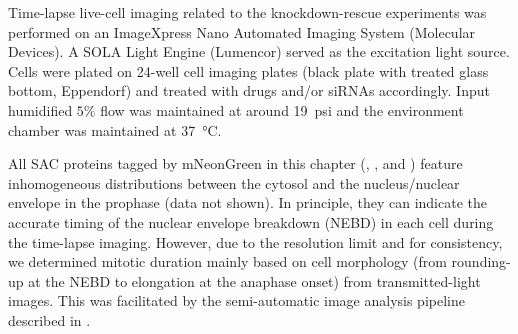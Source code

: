 Time-lapse live-cell imaging related to the knockdown-rescue experiments was performed on an ImageXpress Nano Automated Imaging System (Molecular Devices). A SOLA Light Engine (Lumencor) served as the excitation light source. Cells were plated on 24-well cell imaging plates (black plate with treated glass bottom, Eppendorf) and treated with drugs and/or siRNAs accordingly. Input humidified $5\%$  flow was maintained at around \SI{19}{psi} and the environment chamber was maintained at \SI{37}{\celsius}.

All SAC proteins tagged by mNeonGreen in this chapter (, , and ) feature inhomogeneous distributions between the cytosol and the nucleus/nuclear envelope in the prophase (data not shown). In principle, they can indicate the accurate timing of the nuclear envelope breakdown (NEBD) in each cell during the time-lapse imaging. However, due to the resolution limit and for consistency, we determined mitotic duration mainly based on cell morphology (from rounding-up at the NEBD to elongation at the anaphase onset) from transmitted-light images. This was facilitated by the semi-automatic image analysis pipeline described in . %


